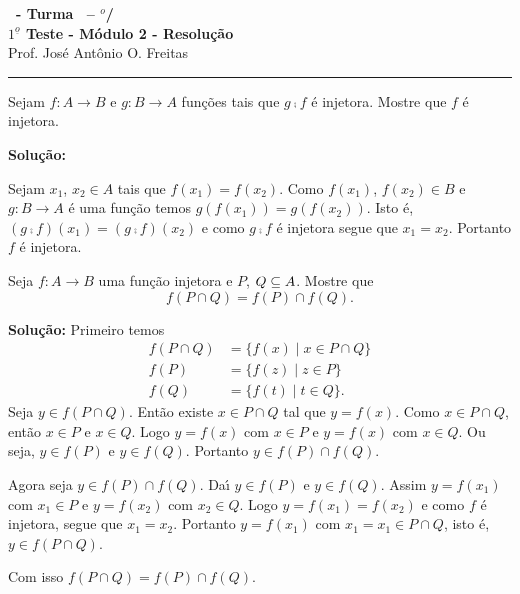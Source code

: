 \documentclass[12pt]{exam}
\begin{document}
\begin{center}
{\Large\bf \disciplina\ - Turma \turma\ -- \semestre$^{o}$/\ano} \\ \vspace{9pt} {\large\bf
$1^{\underline{o}}$ Teste - M\'odulo 2 - Resolu\c{c}\~ao}\\
\vspace{9pt} Prof. Jos{\'e} Ant{\^o}nio O. Freitas
\end{center}
\hrule

\vspace{.6cm}

\questao Sejam $f : A \to B$ e $g : B \to A$ fun\c{c}\~oes tais que $g \comp f$ \'e injetora. Mostre que $f$ \'e injetora.

\noindent\textbf{Solu\c{c}\~ao:}

	Sejam $x_1$, $x_2 \in A$ tais que $f(x_1) = f(x_2)$. Como $f(x_1)$, $f(x_2) \in B$ e $g : B \to A$ \'e uma fun\c{c}\~ao temos $g(f(x_1)) = g(f(x_2))$. Isto \'e, $(g \comp f)(x_1) = (g \comp f)(x_2)$ e como $g \comp f$ \'e injetora segue que $x_1 = x_2$. Portanto $f$ \'e injetora.

\vspace{.5cm}

\questao Seja $f : A \to B$ uma fun\c{c}\~ao injetora e $P$, $Q \subseteq A$. Mostre que
\[
	f(P \cap Q) = f(P) \cap f(Q).
\]

\noindent\textbf{Solu\c{c}\~ao:} Primeiro temos
\begin{align*}
	f(P \cap Q) &= \{f(x) \mid x \in P \cap Q\}\\
	f(P) &= \{f(z) \mid z \in P\}\\
	f(Q) &= \{f(t) \mid t \in Q\}.
\end{align*}
Seja $y \in f(P \cap Q)$. Ent\~ao existe $x \in P \cap Q$ tal que $y = f(x)$. Como $x \in P \cap Q$, ent\~ao $x \in P$ e $x \in Q$. Logo $y = f(x)$ com $x \in P$ e $y = f(x)$ com $x \in Q$. Ou seja, $y \in f(P)$ e $y \in f(Q)$. Portanto $y \in f(P) \cap f(Q)$.

Agora seja $y \in f(P) \cap f(Q)$. Da{\'\i} $y \in f(P)$ e $y \in f(Q)$. Assim $y = f(x_1)$ com $x_1 \in P$ e $y = f(x_2)$ com $x_2 \in Q$. Logo $y = f(x_1) = f(x_2)$ e como $f$ \'e injetora, segue que $x_1 = x_2$. Portanto $y = f(x_1)$ com $x_1 = x_1 \in P \cap Q$, isto \'e, $y \in f(P \cap Q)$.

Com isso $f(P \cap Q) = f(P) \cap f(Q)$.
\end{document}
